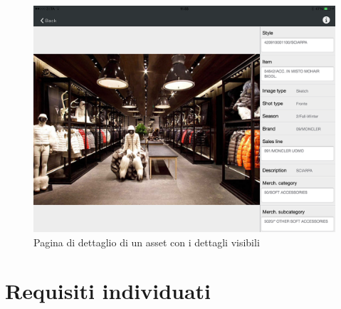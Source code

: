 \begin{figure}[htp]
\centering
\includegraphics[scale=0.25]{../immagini/warda-asset-dettaglio}
\caption{Pagina di dettaglio di un asset con i dettagli visibili}
\end{figure}

\FloatBarrier
\section{Requisiti individuati}

